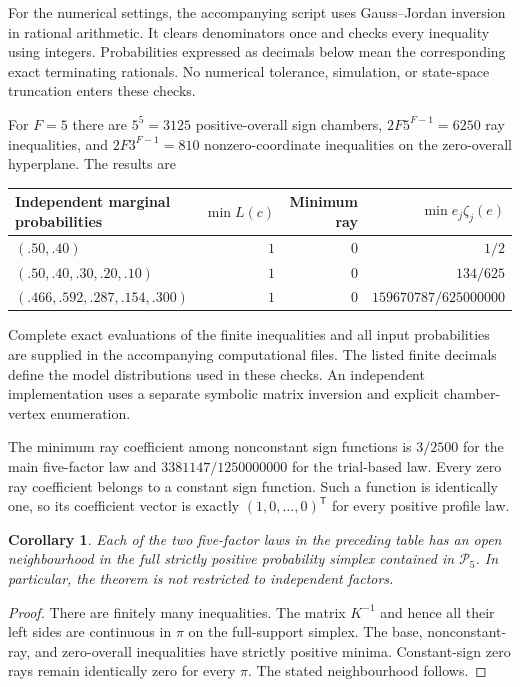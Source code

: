 \documentclass[12pt,a4paper]{article}
\newtheorem{corollary}{Corollary}
\theoremstyle{definition}
\theoremstyle{remark}\newtheorem{remark}{Remark}
\numberwithin{equation}{section}
\newcommand{\trans}{^{\mathsf T}}
\begin{document}
For the numerical settings, the accompanying script uses Gauss--Jordan inversion in rational arithmetic. It clears denominators once and checks every inequality using integers. Probabilities expressed as decimals below mean the corresponding exact terminating rationals. No numerical tolerance, simulation, or state-space truncation enters these checks.

For $F=5$ there are $5^5=3125$ positive-overall sign chambers, $2F5^{F-1}=6250$ ray inequalities, and $2F3^{F-1}=810$ nonzero-coordinate inequalities on the zero-overall hyperplane. The results are
\begin{center}
\small
\begin{tabular}{@{}>{\raggedright\arraybackslash}p{61mm}rrr@{}}
\toprule
Independent marginal probabilities & $\min L(c)$ & Minimum ray & $\min e_j\zeta_j(e)$\\
\midrule
$(.50,.40)$ & $1$ & $0$ & $1/2$\\
$(.50,.40,.30,.20,.10)$ & $1$ & $0$ & $134/625$\\
$(.466,.592,.287,.154,.300)$ & $1$ & $0$ & $159670787/625000000$\\
\bottomrule
\end{tabular}
\end{center}
Complete exact evaluations of the finite inequalities and all input probabilities are supplied in the accompanying computational files. The listed finite decimals define the model distributions used in these checks. An independent implementation uses a separate symbolic matrix inversion and explicit chamber-vertex enumeration.

The minimum ray coefficient among nonconstant sign functions is $3/2500$ for the main five-factor law and $3381147/1250000000$ for the trial-based law. Every zero ray coefficient belongs to a constant sign function. Such a function is identically one, so its coefficient vector is exactly $(1,0,\ldots,0)\trans$ for every positive profile law.

\begin{corollary}\label{cor:open}
Each of the two five-factor laws in the preceding table has an open neighbourhood in the full strictly positive probability simplex contained in $\mathcal P_5$. In particular, the theorem is not restricted to independent factors.
\end{corollary}
\begin{proof}
There are finitely many inequalities. The matrix $K^{-1}$ and hence all their left sides are continuous in $\pi$ on the full-support simplex. The base, nonconstant-ray, and zero-overall inequalities have strictly positive minima. Constant-sign zero rays remain identically zero for every $\pi$. The stated neighbourhood follows.
\end{proof}
\end{document}
